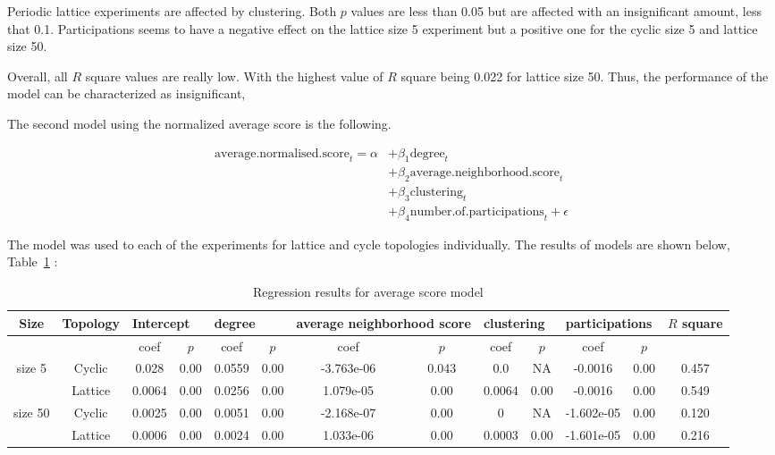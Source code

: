 Periodic lattice experiments are affected by clustering. Both \(p\) values
are less than 0.05 but are affected with an insignificant amount, less that 0.1.
Participations seems to have a negative effect on the lattice size 5 experiment
but a positive one for the cyclic size 5 and lattice size 50.

Overall, all \(R\) square values  are really low. With the highest value of
\(R\) square being 0.022 for lattice size 50. Thus, the performance of the
model can be characterized as insignificant,

The second model using the normalized average score is the following.

\begin{align}
	\mathrm{average.normalised.score}_{t} = \alpha
	  & + \beta_{1}  \mathrm{degree}_{t}                              \\
	  & + \beta_{2}  \mathrm{average.neighborhood.score}_{t}          \\
	  & + \beta_{3}  \mathrm{clustering}_{t}                          \\
	  & + \beta_{4}  \mathrm{number.of.participations}_{t} + \epsilon
\end{align}

The model was used to each of the experiments for lattice and cycle topologies
individually. The results of models are shown below, Table~\ref{regression-average} :

\begin{table}[H]
	\centering
	\begin{adjustbox}{width=1\textwidth, height=0.15\textwidth}
		\small
		\begin{tabular}{ccccccccccccc}
				\toprule
			Size 		& \multicolumn{1}{|l|}{Topology} & \multicolumn{2}{l|}{Intercept} & \multicolumn{2}{l|}{degree} & \multicolumn{2}{l|}{average neighborhood score} & \multicolumn{2}{l|}{clustering} & \multicolumn{2}{l|}{participations} & \(R\) square \\ \midrule
			        &         & coef   & \(p\)    & coef   & \(p\)    & coef       & \(p\)     & coef   & \(p\)    & coef       & \(p\)     &       \\ \midrule
			size 5  & Cyclic  & 0.028  & 0.00 & 0.0559 & 0.00 & -3.763e-06 & 0.043 & 0.0    & NA   & -0.0016    & 0.00 & 0.457 \\ \midrule
			        & Lattice & 0.0064 & 0.00 & 0.0256 & 0.00 & 1.079e-05  & 0.00  & 0.0064 & 0.00 & -0.0016    & 0.00 & 0.549 \\ \midrule
			size 50 & Cyclic  & 0.0025 & 0.00 & 0.0051 & 0.00 & -2.168e-07 & 0.00  & 0      & NA   & -1.602e-05 & 0.00 & 0.120 \\ \midrule
			        & Lattice & 0.0006 & 0.00 & 0.0024 & 0.00 & 1.033e-06  & 0.00  & 0.0003 & 0.00 & -1.601e-05 & 0.00 & 0.216 \\ \bottomrule
		\end{tabular}
	\end{adjustbox}
	\caption{Regression results for average score model}
	\label{regression-average}
\end{table}


